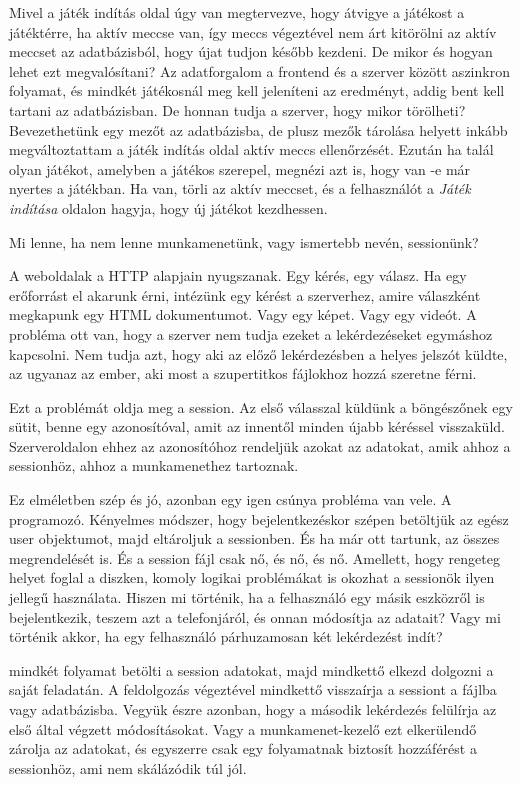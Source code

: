 Mivel a játék indítás oldal úgy van megtervezve, hogy átvigye a játékost a játéktérre, ha aktív meccse van, így meccs végeztével nem árt kitörölni az aktív meccset az adatbázisból, hogy újat tudjon később kezdeni. De mikor és hogyan lehet ezt megvalósítani? Az adatforgalom a frontend és a szerver között aszinkron folyamat, és mindkét játékosnál meg kell jeleníteni az eredményt, addig bent kell tartani az adatbázisban. De honnan tudja a szerver, hogy mikor törölheti? Bevezethetünk egy mezőt az adatbázisba, de plusz mezők tárolása helyett inkább megváltoztattam a játék indítás oldal aktív meccs ellenőrzését. Ezután ha talál olyan játékot, amelyben a játékos szerepel, megnézi azt is, hogy van -e már nyertes a játékban. Ha van, törli az aktív meccset, és a felhasználót a \textit{Játék indítása} oldalon hagyja, hogy új játékot kezdhessen.


Mi lenne, ha nem lenne munkamenetünk, vagy ismertebb nevén, sessionünk?

A weboldalak a HTTP alapjain nyugszanak. Egy kérés, egy válasz. Ha egy erőforrást el akarunk érni, intézünk egy kérést a szerverhez, amire válaszként megkapunk egy HTML dokumentumot. Vagy egy képet. Vagy egy videót. 
A probléma ott van, hogy a szerver nem tudja ezeket a lekérdezéseket egymáshoz kapcsolni. Nem tudja azt, hogy aki az előző lekérdezésben a helyes jelszót küldte, az ugyanaz az ember, aki most a szupertitkos fájlokhoz hozzá szeretne férni.

Ezt a problémát oldja meg a session. Az első válasszal küldünk a böngészőnek egy sütit, benne egy azonosítóval, amit az innentől minden újabb kéréssel visszaküld. Szerveroldalon ehhez az azonosítóhoz rendeljük azokat az adatokat, amik ahhoz a sessionhöz, ahhoz a munkamenethez tartoznak.

Ez elméletben szép és jó, azonban egy igen csúnya probléma van vele. A programozó.
Kényelmes módszer, hogy bejelentkezéskor szépen betöltjük az egész user objektumot, majd eltároljuk a sessionben. És ha már ott tartunk, az összes megrendelését is. És a session fájl csak nő, és nő, és nő.
Amellett, hogy rengeteg helyet foglal a diszken, komoly logikai problémákat is okozhat a sessionök ilyen jellegű használata. Hiszen mi történik, ha a felhasználó egy másik eszközről is bejelentkezik, teszem azt a telefonjáról, és onnan módosítja az adatait? Vagy mi történik akkor, ha egy felhasználó párhuzamosan két lekérdezést indít?

mindkét folyamat betölti a session adatokat, majd mindkettő elkezd dolgozni a saját feladatán. A feldolgozás végeztével mindkettő visszaírja a sessiont a fájlba vagy adatbázisba. Vegyük észre azonban, hogy a második lekérdezés felülírja az első által végzett módosításokat. Vagy a munkamenet-kezelő ezt elkerülendő zárolja az adatokat, és egyszerre csak egy folyamatnak biztosít hozzáférést a sessionhöz, ami nem skálázódik túl jól.


